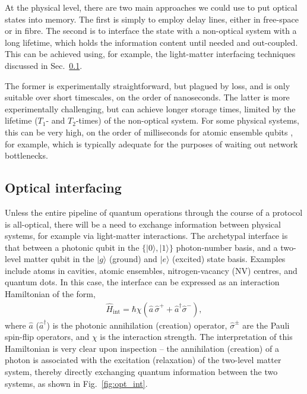 \documentclass[aps,rmp,twocolumn,amsmath,amssymb,nofootinbib,superscriptaddress,longbibliography,floatfix]{revtex4-1}
\newcommand{\ket}[1]{|#1\rangle}
\begin{document}
At the physical level, there are two main approaches we could use to put optical states into memory. The first is simply to employ delay lines, either in free-space or in fibre. The second is to interface the state with a non-optical system with a long lifetime, which holds the information content until needed and out-coupled. This can be achieved using, for example, the light-matter interfacing techniques discussed in Sec.~\ref{sec:opt_inter}.

The former is experimentally straightforward, but plagued by loss, and is only suitable over short timescales, on the order of nanoseconds. The latter is more experimentally challenging, but can achieve longer storage times, limited by the lifetime ($T_1$- and $T_2$-times) of the non-optical system. For some physical systems, this can be very high, on the order of milliseconds for atomic ensemble qubits \cite{bib:Duan02, bib:LauratKimble07}, for example, which is typically adequate for the purposes of waiting out network bottlenecks.

%
%

\subsection{Optical interfacing} \label{sec:opt_inter}

Unless the entire pipeline of quantum operations through the course of a protocol is all-optical, there will be a need to exchange information between physical systems, for example via light-matter interactions. The archetypal interface is that between a photonic qubit in the \mbox{$\{\ket{0},\ket{1}\}$} photon-number basis, and a two-level matter qubit in the $\ket{g}$ (ground) and $\ket{e}$ (excited) state basis. Examples include atoms in cavities, atomic ensembles, nitrogen-vacancy (NV) centres, and quantum dots. In this case, the interface can be expressed as an interaction Hamiltonian of the form,
\begin{align} \label{eq:two_level_hamil}
\hat{H}_\mathrm{int} = \hbar \chi (\hat{a}\,\hat\sigma^+ + \hat{a}^\dag\hat\sigma^-),
\end{align}
where $\hat{a}$ ($\hat{a}^\dag$) is the photonic annihilation (creation) operator, $\hat\sigma^\pm$ are the Pauli spin-flip operators, and $\chi$ is the interaction strength. The interpretation of this Hamiltonian is very clear upon inspection -- the annihilation (creation) of a photon is associated with the excitation (relaxation) of the two-level matter system, thereby directly exchanging quantum information between the two systems, as shown in Fig.~\ref{fig:opt_int}.
\end{document}
